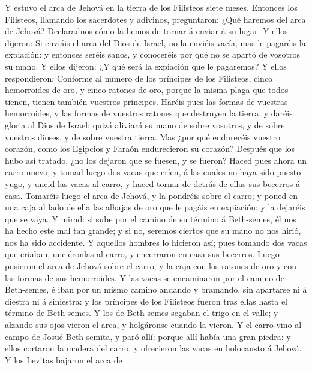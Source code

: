  Y estuvo el arca de Jehová en la tierra de los Filisteos
siete meses.  Entonces los Filisteos, llamando los
sacerdotes y adivinos, preguntaron: ¿Qué haremos del arca de Jehová?
Declaradnos cómo la hemos de tornar á enviar á su lugar. 
Y ellos dijeron: Si enviáis el arca del Dios de Israel, no la enviéis
vacía; mas le pagaréis la expiación: y entonces seréis sanos, y
conoceréis por qué no se apartó de vosotros su mano.  Y
ellos dijeron: ¿Y qué será la expiación que le pagaremos? Y ellos
respondieron: Conforme al número de los príncipes de los Filisteos,
cinco hemorroides de oro, y cinco ratones de oro, porque la misma plaga
que todos tienen, tienen también vuestros príncipes. 
Haréis pues las formas de vuestras hemorroides, y las formas de vuestros
ratones que destruyen la tierra, y daréis gloria al Dios de Israel:
quizá aliviará su mano de sobre vosotros, y de sobre vuestros dioses, y
de sobre vuestra tierra.  Mas ¿por qué endurecéis vuestro
corazón, como los Egipcios y Faraón endurecieron su corazón? Después que
los hubo así tratado, ¿no los dejaron que se fuesen, y se fueron?
 Haced pues ahora un carro nuevo, y tomad luego dos vacas
que críen, á las cuales no haya sido puesto yugo, y uncid las vacas al
carro, y haced tornar de detrás de ellas sus becerros á casa.
 Tomaréis luego el arca de Jehová, y la pondréis sobre el
carro; y poned en una caja al lado de ella las alhajas de oro que le
pagáis en expiación: y la dejaréis que se vaya.  Y mirad:
si sube por el camino de su término á Beth-semes, él nos ha hecho este
mal tan grande; y si no, seremos ciertos que su mano no nos hirió, nos
ha sido accidente.  Y aquellos hombres lo hicieron así;
pues tomando dos vacas que criaban, unciéronlas al carro, y encerraron
en casa sus becerros.  Luego pusieron el arca de Jehová
sobre el carro, y la caja con los ratones de oro y con las formas de sus
hemorroides.  Y las vacas se encaminaron por el camino de
Beth-semes, é iban por un mismo camino andando y bramando, sin apartarse
ni á diestra ni á siniestra: y los príncipes de los Filisteos fueron
tras ellas hasta el término de Beth-semes.  Y los de
Beth-semes segaban el trigo en el valle; y alzando sus ojos vieron el
arca, y holgáronse cuando la vieron.  Y el carro vino al
campo de Josué Beth-semita, y paró allí: porque allí había una gran
piedra: y ellos cortaron la madera del carro, y ofrecieron las vacas en
holocausto á Jehová.  Y los Levitas bajaron el arca de
